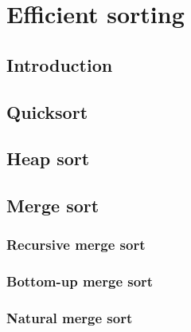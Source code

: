 \documentclass[oneside]{book}
\begin{document}
\section{Efficient sorting}

\subsection{Introduction}

\subsection{Quicksort}

\subsection{Heap sort}

\subsection{Merge sort}

\subsubsection{Recursive merge sort}

\subsubsection{Bottom-up merge sort}

\subsubsection{Natural merge sort}
\end{document}
